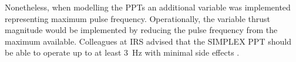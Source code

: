 

Nonetheless, when modelling the PPTs an additional variable was implemented representing maximum pulse frequency. Operationally, the variable thrust magnitude would be implemented by reducing the pulse frequency from the maximum available. Colleagues at IRS advised that the SIMPLEX PPT should be able to operate up to at least 3~Hz with minimal side effects \parencite{Nawaz2008}.



